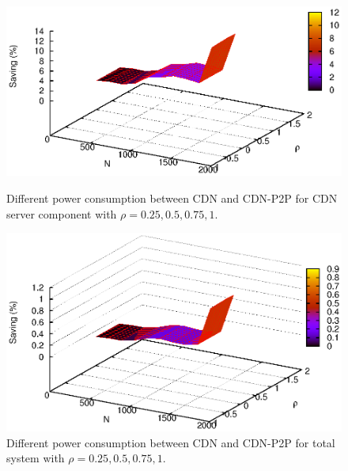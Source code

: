 \documentclass[conference]{IEEEtran}
\begin{document}
\begin{figure}[htp!]
\centering
\begin{minipage}[b]{0.4\linewidth}
	\includegraphics[scale=0.5]{graphs/diff3dimension.eps}
	\caption{Different power consumption between CDN and CDN-P2P for CDN server component with $\rho=0.25,0.5,0.75,1$.}
	\label{fig:diff1}
\end{minipage}
\hfill
\begin{minipage}[b]{0.4\linewidth}
	\includegraphics[scale=0.5]{graphs/diff3dimension2.eps}
	\caption{Different power consumption between CDN and CDN-P2P for total system with $\rho=0.25,0.5,0.75,1$.}
	\label{fig:diff2}
\end{minipage}
\label{fig:maindiff}
\end{figure}
\end{document}
